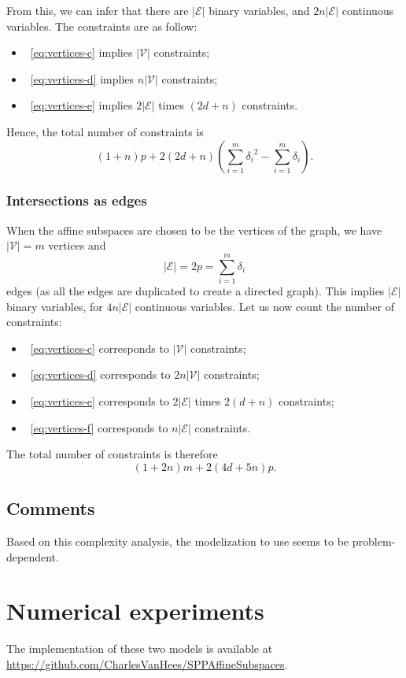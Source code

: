 \documentclass[a4paper, 12pt]{article}
\begin{document}
From this, we can infer that there are $|\mathcal{E}|$ binary variables, and $2n|\mathcal{E}|$ continuous variables. The constraints are as follow:
\begin{itemize}[label={}, leftmargin=0.5cm]
    \item~\ref{eq:vertices-c} implies $|\mathcal{V}|$        constraints;
    \item~\ref{eq:vertices-d} implies $n|\mathcal{V}|$       constraints;
    \item~\ref{eq:vertices-e} implies $2|\mathcal{E}|$ times $(2d+n)$ constraints.
\end{itemize}
Hence, the total number of constraints is \[(1+n)p + 2(2d+n) \left(\sum_{i=1}^m {\delta_i}^2 - \sum_{i=1}^m \delta_i\right).\]

\subsubsection{Intersections as edges}
When the affine subspaces are chosen to be the vertices of the graph, we have $|\mathcal{V}| = m$ vertices and \[|\mathcal{E}| = 2p = \sum_{i=1}^{m} \delta_i\] edges (as all the edges are duplicated to create a directed graph). This implies $|\mathcal{E}|$ binary variables, for $4n|\mathcal{E}|$ continuous variables. Let us now count the number of constraints:
\begin{itemize}[label={}, leftmargin=0.5cm]
    \item~\ref{eq:vertices-c} corresponds to $|\mathcal{V}|$   constraints;
    \item~\ref{eq:vertices-d} corresponds to $2n|\mathcal{V}|$ constraints;
    \item~\ref{eq:vertices-e} corresponds to $2|\mathcal{E}|$ times $2(d+n)$ constraints;
    \item~\ref{eq:vertices-f} corresponds to $n|\mathcal{E}|$  constraints.
\end{itemize}
The total number of constraints is therefore \[(1+2n)m + 2(4d+5n)p.\]

\subsection{Comments}
Based on this complexity analysis, the modelization to use seems to be problem-dependent.

\section{Numerical experiments}\label{sec:experiments}
The implementation of these two models is available at \url{https://github.com/CharlesVanHees/SPPAffineSubspaces}.

\printbibliography{}
\end{document}
